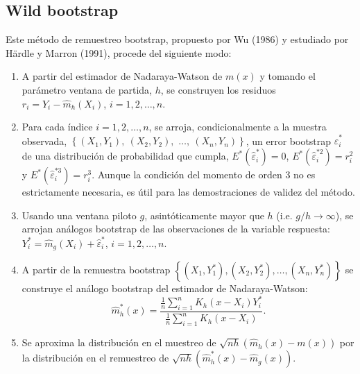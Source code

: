 \documentclass[
]{book}
\theoremstyle{break}
\theoremstyle{definition}
\theoremstyle{definition}
\theoremstyle{definition}
\theoremstyle{remark}
\begin{document}
\hypertarget{wild-bootstrap}{%
\subsection{Wild bootstrap}\label{wild-bootstrap}}

Este método de remuestreo bootstrap, propuesto por Wu (1986) y estudiado
por Härdle y Marron (1991), procede del siguiente modo:

\begin{enumerate}
\def\labelenumi{\arabic{enumi}.}
\item
  A partir del estimador de Nadaraya-Watson de \(m\left( x \right)\) y
  tomando el parámetro ventana de partida, \(h\), se construyen los
  residuos
  \(r_i = Y_i - \hat{m}_{h}\left( X_i \right)\),
  \(i=1, 2, \ldots, n\).
\item
  Para cada índice \(i=1,2,\ldots ,n\), se arroja, condicionalmente a la
  muestra observada, \(\left\{ \left( X_1,Y_1 \right), \ \left( X_2,Y_2 \right),\right.\)
  \(\left.\ldots ,\ \left( X_n,Y_n \right) \right\}\),
  un error bootstrap \(\hat{\varepsilon}_i^{\ast}\) de una
  distribución de probabilidad que cumpla,
  \(E^{\ast}\left( \hat{\varepsilon}_i^{\ast} \right) =0\),
  \(E^{\ast}\left( \hat{\varepsilon}_i^{\ast 2} \right) =r_i^2\) y
  \(E^{\ast}\left( \hat{\varepsilon}_i^{\ast 3} \right) =r_i^{3}\).
  Aunque la condición del momento de orden 3 no es estrictamente necesaria,
  es útil para las demostraciones de validez del método.
\item
  Usando una ventana piloto \(g\), asintóticamente mayor que \(h\) (i.e.
  \(g/h\rightarrow \infty\)), se arrojan análogos bootstrap de las
  observaciones de la variable respuesta:
  \(Y_i^{\ast}=\hat{m}_{g}\left(X_i \right)  +\hat{\varepsilon}_i^{\ast}\), \(i=1,2,\ldots ,n\).
\item
  A partir de la remuestra bootstrap \(\left\{ \left( X_1,Y_1^{\ast } \right),\left( X_2,Y_2^{\ast} \right),\ldots ,\left( X_n,Y_n^{\ast} \right) \right\}\) se construye el análogo
  bootstrap del estimador de Nadaraya-Watson:
  \[\hat{m}_{h}^{\ast}\left( x \right) =\frac{\frac{1}{n}\sum_{i=1}^{n}K_{h}
  \left( x-X_i \right) Y_i^{\ast}}{\frac{1}{n}\sum_{i=1}^{n}K_{h}\left(
  x-X_i \right)}.\]
\item
  Se aproxima la distribución en el muestreo de \(\sqrt{nh}\left( \hat{m}_{h}\left( x \right) -m\left( x \right) \right)\) por la
  distribución en el remuestreo de
  \(\sqrt{nh}\left( \hat{m}_{h}^{\ast}\left( x \right) - \hat{m}_{g}\left( x \right) \right)\).
\end{enumerate}
\end{document}
